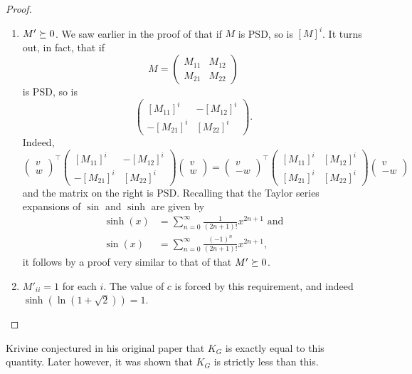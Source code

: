 \begin{proof}
\begin{enumerate}[label=(\alph*)]
			\item $M' \succeq 0$. We saw earlier in the proof of  that if $M$ is PSD, so is $[M]^i$. It turns out, in fact, that if
			\[ M = \begin{pmatrix} M_{11} & M_{12} \\ M_{21} & M_{22} \end{pmatrix} \]
			is PSD, so is
			\[ \begin{pmatrix} [M_{11}]^i & -[M_{12}]^i \\ -[M_{21}]^i & [M_{22}]^i \end{pmatrix}. \]
			Indeed,
			\[ \begin{pmatrix} v \\ w \end{pmatrix}^\top \begin{pmatrix} [M_{11}]^i & -[M_{12}]^i \\ -[M_{21}]^i & [M_{22}]^i \end{pmatrix} \begin{pmatrix} v \\ w \end{pmatrix} = \begin{pmatrix} v \\ -w \end{pmatrix}^\top \begin{pmatrix} [M_{11}]^i & [M_{12}]^i \\ [M_{21}]^i & [M_{22}]^i \end{pmatrix} \begin{pmatrix} v \\ -w \end{pmatrix} \]
			and the matrix on the right is PSD.
			Recalling that the Taylor series expansions of $\sin$ and $\sinh$ are given by
			\begin{align*}
				\sinh(x) &= \sum_{n=0}^{\infty} \frac{1}{(2n+1)!} x^{2n+1} \text{ and} \\
				\sin(x) &= \sum_{n=0}^{\infty} \frac{(-1)^n}{(2n+1)!} x^{2n+1},
			\end{align*}
			it follows by a proof very similar to that of  that $M' \succeq 0$.
			\item $M'_{ii} = 1$ for each $i$. The value of $c$ is forced by this requirement, and indeed $\sinh(\ln(1+\sqrt{2})) = 1$. \qedhere
		\end{enumerate}
	\end{proof}

	Krivine conjectured in his original paper that $K_G$ is exactly equal to this quantity. Later however, it was shown \cite{braverman-krivine} that $K_G$ is strictly less than this.\\

